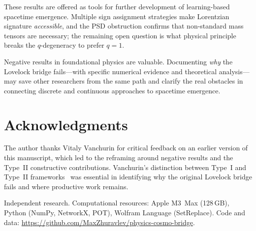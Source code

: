 \documentclass[11pt]{article}
\theoremstyle{definition}
\theoremstyle{remark}
\begin{document}
These results are offered as tools for further development of
learning-based spacetime emergence.
Multiple sign assignment strategies make Lorentzian signature
\emph{accessible}, and the PSD obstruction confirms that non-standard
mass tensors are necessary; the remaining open question is what
physical principle breaks the $q$-degeneracy to prefer $q = 1$.

Negative results in foundational physics are valuable.
Documenting \emph{why} the Lovelock bridge fails---with specific
numerical evidence and theoretical analysis---may save other
researchers from the same path and clarify the real obstacles in
connecting discrete and continuous approaches to spacetime emergence.

\section*{Acknowledgments}

The author thanks Vitaly Vanchurin for critical feedback on an earlier
version of this manuscript, which led to the reframing around
negative results and the Type~II constructive contributions.
Vanchurin's distinction between Type~I and Type~II
frameworks~\cite{Vanchurin2025} was essential in identifying why the
original Lovelock bridge fails and where productive work remains.

Independent research.
Computational resources: Apple M3~Max (128\,GB), Python (NumPy,
NetworkX, POT), Wolfram Language (SetReplace).
Code and data: \url{https://github.com/MaxZhuravlev/physics-cosmo-bridge}.



\end{document}
